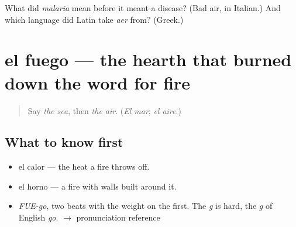 \begin{tcolorbox}[breakable,colback=teal!4,colframe=teal!35!black,title={Before you move on}]
What did \emph{malaria} mean before it meant a disease? (Bad air, in Italian.) And which language did Latin take \emph{aer} from? (Greek.)
\end{tcolorbox}
\section[el fuego]{el fuego — the hearth that burned down the word for fire}

\label{lesson:ES-C362-fuego}



\begin{quote}
Say \emph{the sea}, then \emph{the air}. (\emph{El mar}; \emph{el aire}.)
\end{quote}

\subsection*{What to know first}
\begin{itemize}
\raggedright
  \item el calor — the heat a fire throws off.
  \item el horno — a fire with walls built around it.
\end{itemize}

\begin{sounds}
\begin{itemize}
\raggedright
  \item \emph{FUE-go}, two beats with the weight on the first. The \emph{g} is hard, the \emph{g} of English \emph{go}. $\to$ pronunciation reference
\end{itemize}
\end{sounds}

